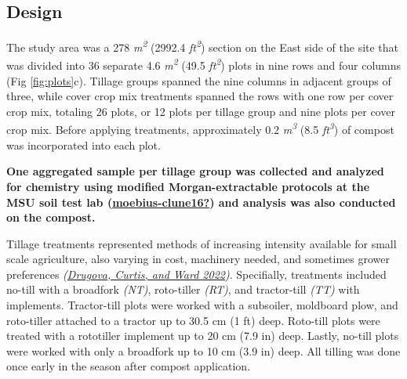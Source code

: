 \documentclass[
]{article}
\begin{document}
\hypertarget{design}{%
\subsection{Design}\label{design}}

The study area was a 278 \emph{m\textsuperscript{2}} (2992.4 \emph{ft\textsuperscript{2}}) section on the East side of the site that was divided into 36 separate 4.6 \emph{m\textsuperscript{2}} (49.5 \emph{ft\textsuperscript{2}}) plots in nine rows and four columns (Fig \ref{fig:plots}c).
Tillage groups spanned the nine columns in adjacent groups of three, while cover crop mix treatments spanned the rows with one row per cover crop mix, totaling 26 plots, or 12 plots per tillage group and nine plots per cover crop mix.
Before applying treatments, approximately 0.2 \emph{m\textsuperscript{3}} (8.5 \emph{ft\textsuperscript{3}}) of compost was incorporated into each plot.

\textbf{One aggregated sample per tillage group was collected and analyzed for chemistry using modified Morgan-extractable protocols at the MSU soil test lab (\protect\hyperlink{ref-moebius-clune16}{\textbf{moebius-clune16?}}) and analysis was also conducted on the compost.}

Tillage treatments represented methods of increasing intensity available for small scale agriculture, also varying in cost, machinery needed, and sometimes grower preferences \emph{(\protect\hyperlink{ref-drugova22}{Drugova, Curtis, and Ward 2022})}.
Specifially, treatments included no-till with a broadfork \emph{(NT)}, roto-tiller \emph{(RT)}, and tractor-till \emph{(TT)} with implements.
Tractor-till plots were worked with a subsoiler, moldboard plow, and roto-tiller attached to a tractor up to 30.5 cm (1 ft) deep.
Roto-till plots were treated with a rototiller implement up to 20 cm (7.9 in) deep.
Lastly, no-till plots were worked with only a broadfork up to 10 cm (3.9 in) deep.
All tilling was done once early in the season after compost application.
\end{document}

